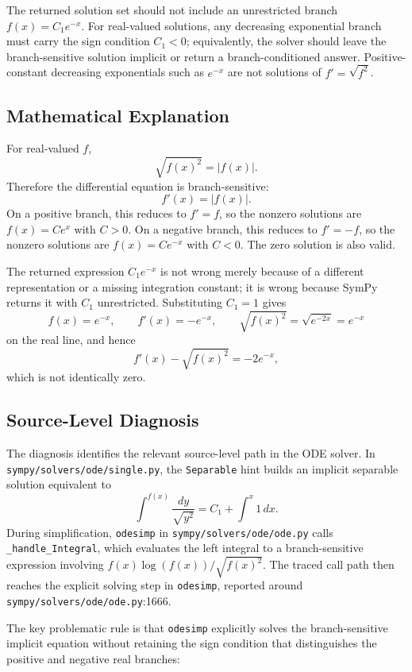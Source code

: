 \documentclass[11pt]{article}
\begin{document}
The returned solution set should not include an unrestricted branch
\(f(x)=C_1 e^{-x}\).  For real-valued solutions, any decreasing exponential
branch must carry the sign condition \(C_1<0\); equivalently, the solver should
leave the branch-sensitive solution implicit or return a branch-conditioned
answer.  Positive-constant decreasing exponentials such as \(e^{-x}\) are not
solutions of \(f'=\sqrt{f^2}\).

\subsection{Mathematical Explanation}

For real-valued \(f\),
\[
  \sqrt{f(x)^2}=|f(x)|.
\]
Therefore the differential equation is branch-sensitive:
\[
  f'(x)=|f(x)|.
\]
On a positive branch, this reduces to \(f'=f\), so the nonzero solutions are
\(f(x)=C e^x\) with \(C>0\).  On a negative branch, this reduces to
\(f'=-f\), so the nonzero solutions are \(f(x)=C e^{-x}\) with \(C<0\).  The
zero solution is also valid.

The returned expression \(C_1 e^{-x}\) is not wrong merely because of a
different representation or a missing integration constant; it is wrong because
SymPy returns it with \(C_1\) unrestricted.  Substituting \(C_1=1\) gives
\[
  f(x)=e^{-x},\qquad f'(x)=-e^{-x},\qquad
  \sqrt{f(x)^2}=\sqrt{e^{-2x}}=e^{-x}
\]
on the real line, and hence
\[
  f'(x)-\sqrt{f(x)^2}=-2e^{-x},
\]
which is not identically zero.

\subsection{Source-Level Diagnosis}

The diagnosis identifies the relevant source-level path in the ODE solver.  In
\nolinkurl{sympy/solvers/ode/single.py}, the \texttt{Separable} hint builds an
implicit separable solution equivalent to
\[
  \int^{f(x)} \frac{d y}{\sqrt{y^2}} = C_1 + \int^x 1\,d x.
\]
During simplification, \texttt{odesimp} in
\nolinkurl{sympy/solvers/ode/ode.py} calls \texttt{\_handle\_Integral}, which
evaluates the left integral to a branch-sensitive expression involving
\(f(x)\log(f(x))/\sqrt{f(x)^2}\).  The traced call path then reaches the
explicit solving step in \texttt{odesimp}, reported around
\nolinkurl{sympy/solvers/ode/ode.py}:1666.

The key problematic rule is that \texttt{odesimp} explicitly solves the
branch-sensitive implicit equation without retaining the sign condition that
distinguishes the positive and negative real branches:
\end{document}
